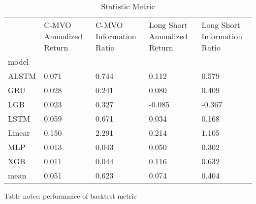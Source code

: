 \documentclass[10pt,letterpaper]{article}
\begin{document}
\begin{table}[!ht]
\centering
\caption{Statistic Metric}
\begin{tabular}{lp{1.5cm}p{1.5cm}p{1.5cm}p{1.5cm}}
\toprule
{} &  C-MVO Annualized Return &  C-MVO Information Ratio &  Long Short Annualized Return &  Long Short Information Ratio \\
model  &                          &                          &                               &                               \\
\midrule
ALSTM  &                    0.071 &                    0.744 &                         0.112 &                         0.579 \\
GRU    &                    0.028 &                    0.241 &                         0.080 &                         0.409 \\
LGB    &                    0.023 &                    0.327 &                        -0.085 &                        -0.367 \\
LSTM   &                    0.059 &                    0.671 &                         0.034 &                         0.168 \\
Linear &                    0.150 &                    2.291 &                         0.214 &                         1.105 \\
MLP    &                    0.013 &                    0.043 &                         0.050 &                         0.302 \\
XGB    &                    0.011 &                    0.044 &                         0.116 &                         0.632 \\
\hline
mean   &                    0.051 &                    0.623 &                         0.074 &                         0.404 \\
\bottomrule
\end{tabular}
\begin{flushleft}
Table notes: performance of backtest metric
\end{flushleft}
\label{strategy}
\end{table}
\nolinenumbers
\end{document}
